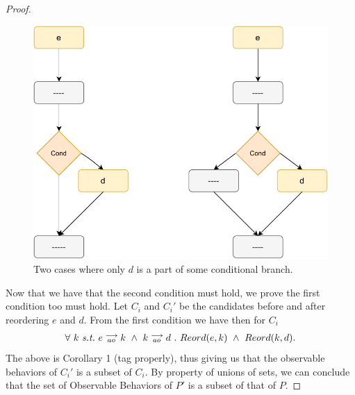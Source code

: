 \begin{proof}
\begin{itemize}
                    \begin{figure}[H]
                        \centering 
                        \includegraphics[scale=0.5]{5.InstructionReordering/5.ValidReorderingProgram/ConditionalsProofFig3.pdf}
                        \caption{Two cases where only $d$ is a part of some conditional branch.}
                    \end{figure}

            \end{itemize}

            Now that we have that the second condition must hold, we prove the first condition too must hold. Let $C_i$ and $C_i'$ be the candidates before and after reordering $e$ and $d$. From the first condition we have then for $C_i$
            \begin{align*}
                \forall \ k \ \textit{s.t.} \ 
                \reln{e}{ao}{k} \ \wedge \ \reln{k}{ao}{d} \ . \ 
                Reord(e,k) \ \wedge \ Reord(k,d).
            \end{align*}
            The above is Corollary 1 (tag properly), thus giving us that the observable behaviors of $C_i'$ is a subset of $C_i$. By property of unions of sets, we can conclude that the set of Observable Behaviors of $P'$ is a subset of that of $P$.

        \end{proof}


